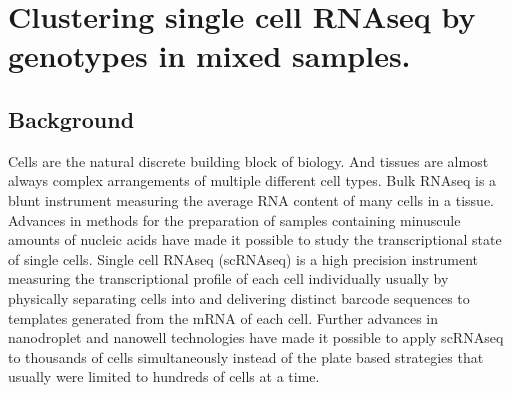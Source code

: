 
\chapter{Clustering single cell RNAseq by genotypes in mixed samples.}

\ifpdf
    \graphicspath{{Chapter2/Figs/Raster/}{Chapter2/Figs/PDF/}{Chapter2/Figs/}}
\else
    \graphicspath{{Chapter2/Figs/Vector/}{Chapter2/Figs/}}
\fi



\section{Background}
\par{
Cells are the natural discrete building block of biology. And tissues are almost always complex arrangements of multiple different cell types. Bulk RNAseq is a blunt 
instrument measuring the average RNA content of many cells in a tissue. 
Advances in methods for the preparation of samples containing minuscule amounts of nucleic acids have made it possible to study the transcriptional state of single cells\cite{first_singlecell}.
Single cell RNAseq (scRNAseq) is a high precision instrument measuring the transcriptional profile of each cell individually usually by physically separating cells into and delivering distinct barcode sequences to templates generated from the mRNA of each cell\cite{smartseq2}.
Further advances in nanodroplet and nanowell technologies have made it possible to apply scRNAseq to thousands of cells simultaneously\cite{dropseq}\cite{10xsinglecell}\cite{seqwell} instead of the plate based strategies that usually were limited to hundreds of cells at a time\cite{smartseq2}. 
} 






